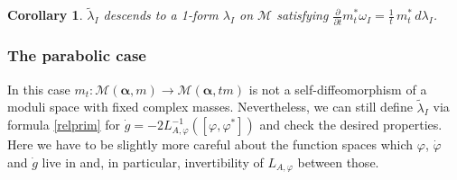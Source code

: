 \documentclass[12pt,letterpaper,reqno]{amsart}
\def\mathbf#1{#1}%
\newtheorem{cor}[thm]{Corollary}
\theoremstyle{remark}
\theoremstyle{definition}
\numberwithin{thm}{section}
\numberwithin{equation}{section}
\numberwithin{figure}{section}
\begin{document}
\begin{cor}
$\tilde \lambda_I$ descends to a 1-form $\lambda_I$ on $\mathcal M$ satisfying $\frac{\partial}{\partial t}  m_t^* \omega_I = \frac{1}{t} \, m_t^* \, d \lambda_I$. 
\end{cor}
\subsubsection{The parabolic case}

In this case $m_t : \mathcal{M}(\boldsymbol{\alpha}, \mathbf{m}) \to \mathcal{M}(\boldsymbol{\alpha}, t \mathbf{m}) $ is not a self-diffeomorphism of a moduli space with fixed complex masses. Nevertheless, we can still define $\tilde \lambda_I$ via formula \eqref{relprim} for $\dot g = -2 L_{A,\varphi}^{-1}( [\varphi,\varphi^*])$ and check the desired properties. Here we have to be slightly more careful about the function spaces which $\varphi$, $\dot \varphi$ and $\dot g$ live in and, in particular, invertibility of $L_{A,\varphi}$ between those. 
\end{document}
